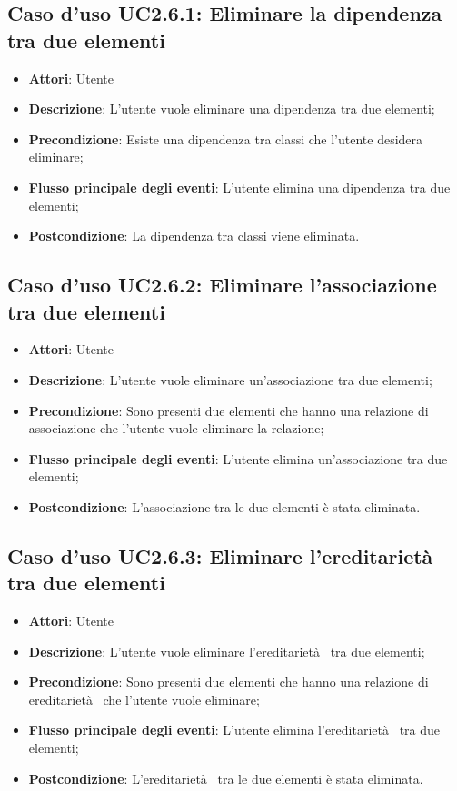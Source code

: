 \documentclass[../AnalisiDeiRequisiti.tex]{subfiles}
\begin{document}
		\subsection{Caso d'uso UC2.6.1: Eliminare la dipendenza tra due elementi }
		\begin{itemize}
			\item \textbf{Attori}: Utente
			\item \textbf{Descrizione}: L'utente vuole eliminare una dipendenza tra due elementi;
			\item \textbf{Precondizione}: Esiste una dipendenza tra classi che l'utente desidera eliminare;
			\item \textbf{Flusso principale degli eventi}: L'utente elimina una dipendenza tra due elementi;
			\item \textbf{Postcondizione}: La dipendenza tra classi viene eliminata.
		\end{itemize}
		\subsection{Caso d'uso UC2.6.2: Eliminare l'associazione tra due elementi}
		\begin{itemize}
			\item \textbf{Attori}: Utente
			\item \textbf{Descrizione}: L'utente vuole eliminare un'associazione tra due elementi;
			\item \textbf{Precondizione}: Sono presenti due elementi che hanno una relazione di associazione che l'utente vuole eliminare la relazione;
			\item \textbf{Flusso principale degli eventi}: L'utente elimina un'associazione tra due elementi;
			\item \textbf{Postcondizione}: L'associazione tra le due elementi è stata eliminata.
		\end{itemize}
		\subsection{Caso d'uso UC2.6.3: Eliminare l'ereditarietà  tra due elementi}
		\begin{itemize}
			\item \textbf{Attori}: Utente
			\item \textbf{Descrizione}: L'utente vuole eliminare l'ereditarietà  tra due elementi;
			\item \textbf{Precondizione}: Sono presenti due elementi che hanno una relazione di ereditarietà  che l'utente vuole eliminare;
			\item \textbf{Flusso principale degli eventi}: L'utente elimina l'ereditarietà  tra due elementi;
			\item \textbf{Postcondizione}: L'ereditarietà  tra le due elementi è stata eliminata.
		\end{itemize}
\end{document}
